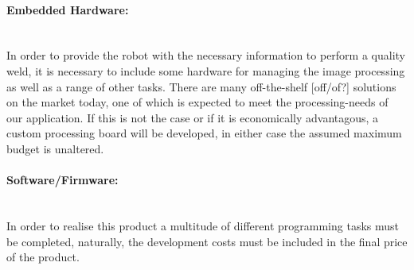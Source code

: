 \paragraph{Embedded Hardware:}~\\
In order to provide the robot with the necessary information to perform a quality weld, it is necessary to include some hardware for managing the image processing as well as a range of other tasks. There are many off-the-shelf [off/of?] solutions on the market today, one of which is expected to meet the processing-needs of our application. If this is not the case or if it is economically advantagous, a custom processing board will be developed, in either case the assumed maximum budget is unaltered.
\paragraph{Software/Firmware:}~\\
In order to realise this product a multitude of different programming tasks must be completed, naturally, the development costs must be included in the final price of the product.
